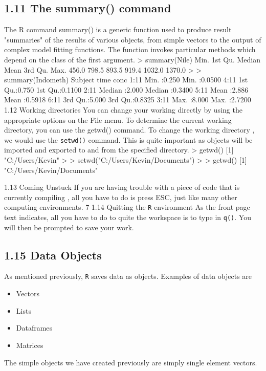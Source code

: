 \subsection{1.11 The summary() command}
The R command summary() is a generic function used to produce result "summaries" of the
results of various objects, from simple vectors to the output of complex model fitting functions.
The function invokes particular methods which depend on the class of the first argument.
> summary(Nile)
Min. 1st Qu. Median Mean 3rd Qu. Max.
456.0 798.5 893.5 919.4 1032.0 1370.0
>
> summary(Indometh)
Subject time conc
1:11 Min. :0.250 Min. :0.0500
4:11 1st Qu.:0.750 1st Qu.:0.1100
2:11 Median :2.000 Median :0.3400
5:11 Mean :2.886 Mean :0.5918
6:11 3rd Qu.:5.000 3rd Qu.:0.8325
3:11 Max. :8.000 Max. :2.7200
1.12 Working directories
You can change your working directly by using the appropriate options on the File menu. To
determine the current working directory, you can use the getwd() command. To change the
working directory , we would use the \texttt{setwd()} command. This is quite important as objects
will be imported and exported to and from the specified directory.
> getwd()
[1] "C:/Users/Kevin"
>
> setwd("C:/Users/Kevin/Documents")
>
> getwd()
[1] "C:/Users/Kevin/Documents"

1.13 Coming Unstuck
If you are having trouble with a piece of code that is currently compiling , all you have to do
is press ESC, just like many other computing environments.
7
1.14 Quitting the \texttt{R} environment
As the front page text indicates, all you have to do to quite the workspace is to type in \texttt{q()}.
You will then be prompted to save your work.

\subsection{1.15 Data Objects}
As mentioned previously, \texttt{R} saves data as objects. Examples of data objects are
\begin{itemize}
\item Vectors
\item Lists
\item Dataframes
\item Matrices
\end{itemize}
The simple objects we have created previously are simply single element vectors.



